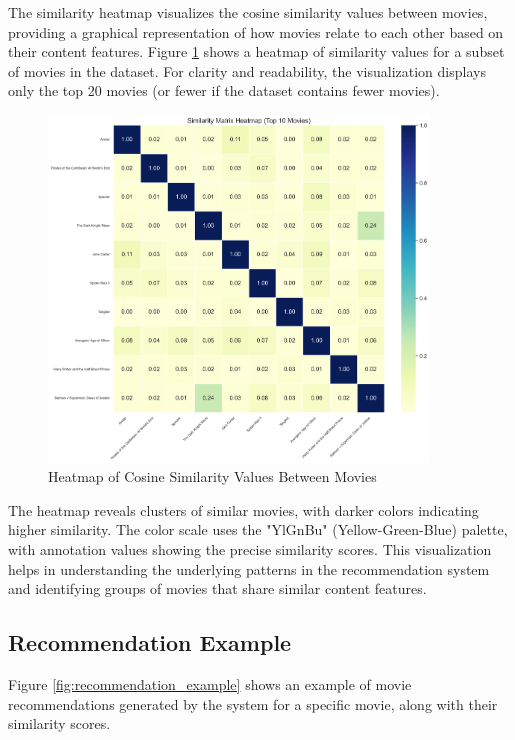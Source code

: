 \documentclass[12pt,a4paper]{article}
\begin{document}
The similarity heatmap visualizes the cosine similarity values between movies, providing a graphical representation of how movies relate to each other based on their content features. Figure \ref{fig:similarity_heatmap} shows a heatmap of similarity values for a subset of movies in the dataset. For clarity and readability, the visualization displays only the top 20 movies (or fewer if the dataset contains fewer movies).

\begin{figure}[H]
    \centering
    \includegraphics[width=0.9\textwidth]{static/visualizations/similarity_heatmap.png}
    \caption{Heatmap of Cosine Similarity Values Between Movies}
    \label{fig:similarity_heatmap}
\end{figure}

The heatmap reveals clusters of similar movies, with darker colors indicating higher similarity. The color scale uses the "YlGnBu" (Yellow-Green-Blue) palette, with annotation values showing the precise similarity scores. This visualization helps in understanding the underlying patterns in the recommendation system and identifying groups of movies that share similar content features.

\subsection{Recommendation Example}

Figure \ref{fig:recommendation_example} shows an example of movie recommendations generated by the system for a specific movie, along with their similarity scores.
\end{document}
